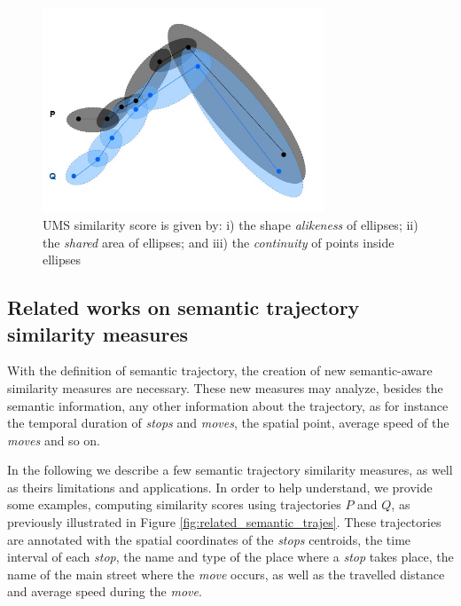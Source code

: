 \begin{figure}[!h]
\centering
\includegraphics[width=0.75\textwidth]{Related_Works/related_trajes-UMS.jpg}
\caption{\label{fig:related_trajes_UMS}UMS similarity score is given by: i) the shape \textit{alikeness} of ellipses; ii) the \textit{shared} area of ellipses; and iii) the \textit{continuity} of points inside ellipses}
\end{figure}

\subsection{Related works on semantic trajectory similarity measures} \label{sec:related_semantic}

With the definition of semantic trajectory, the creation of new semantic-aware similarity measures are necessary. These new measures may analyze, besides the semantic information, any other information about the trajectory, as for instance the temporal duration of \emph{stops} and \emph{moves}, the spatial point, average speed of the \emph{moves} and so on.

In the following we describe a few semantic trajectory similarity measures, as well as theirs limitations and applications. In order to help understand, we provide some examples, computing similarity scores using trajectories $P$ and $Q$, as previously illustrated in Figure \ref{fig:related_semantic_trajes}. These trajectories are annotated with the spatial coordinates of the \emph{stops} centroids, the time interval of each \emph{stop}, the name and type of the place where a \emph{stop} takes place, the name of the main street where the \emph{move} occurs, as well as the travelled distance and average speed during the \emph{move}.


